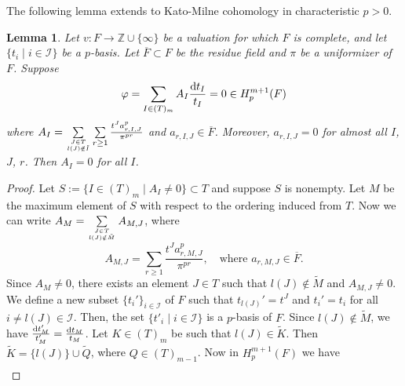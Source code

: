 \documentclass[times,10pt]{amsart}
\newcommand{\Z}{\ensuremath{\mathbb{Z}}}
\newcommand{\dd}{{\rm d}}
\newcommand{\I}{\ensuremath{\mathcal{I}}}
\newcommand{\n}{\ensuremath{\infty}}
\renewcommand{\phi}{\varphi}
\newtheorem{lemma}[thm]{Lemma}%
\begin{document}
     The following lemma   extends  \cite[Proposition 1.5]{AJ} {to Kato-Milne cohomology in characteristic $p>0$}. 
\begin{lemma}\label{lu} {Let $v:F\xrightarrow{}\Z\cup\{\n\}$ be a valuation for which $F$ is complete, and let $\{ t_i\mid i\in \I\}$ be a $p$-basis.} Let $\overline{F}\subset F$ be the residue field and $\pi$ be a uniformizer of $F$.  Suppose $$ \phi= \sum_{I\in (T)_m} A_I \frac{\dd t_I}{ t_I}=0\in H_p^{m+1}(F)$$ where $  A_I = \sum\limits_{J\in T\atop l(J)\notin \tilde{I}}\sum\limits_{r\geq 1}   \frac{t^Ja_{r,I,J}^p}{\pi^{pr}} $ and $ a_{r,I,J}\in \overline{F}$. Moreover, $a_{r,I,J}=0$ for {almost} all $I$, $J$, $r$. Then $A_I=0$ for all $I$.  
\end{lemma}
\begin{proof}
     Let $ S:= \{ I\in (T)_m\mid  A_I\neq 0\}\subset T$ and suppose $S$ {is} nonempty. Let $M$ be the maximum element of $S$ with respect to the  ordering induced from $T$.  Now we can write $ A_M= \sum\limits_{J\in T\atop l(J)\notin  \tilde{M}} A_{M,J} $, where  \begin{equation}\label{5etr} A_{M,J}= \sum\limits_{r\geq 1} \frac{{t^Ja^p_{r,M,J}}}{\pi^{pr}},\quad \text{where } a_{r,M,J}\in \overline{F}.
             \end{equation}   Since $A_M\neq 0$, there exists an element $J\in {T}$ such that $l(J)\notin \tilde{M}$ and $A_{M,J}\neq 0$.   We define a new subset $\{t_i'\}_{i\in \I}$ of $F$ such that  $t_{l(J)}'= t^J$ and $t_i'=t_i$ for all $i\neq l(J)\in \I$.   Then, the set $\{ t'_i\mid i\in \I\}$ is a $p$-basis of $F$.   Since  $ l(J)\notin \tilde{M}$, we have $ \frac{ \dd {t_M'}}{t'_{M}}  =\frac{\dd {t_M}}{t_M} $. Let $K\in (T)_m$ be such that $l(J)\in \tilde{K}$. Then $\tilde{K}= \{l(J)\}\cup\tilde{Q}$, where $Q\in (T)_{m-1}$. Now in $H_p^{m+1}(F)$  we have\begin{align*}

\end{align*}
\end{proof}
\end{document}
